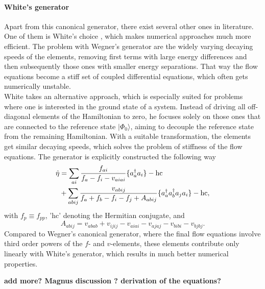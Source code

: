 \paragraph{White's generator}
Apart from this canonical generator, there exist several other ones in
literature. One of them is White's choice
\cite{White:2002fk}, which makes numerical approaches much
more efficient.  The problem with Wegner's generator are the widely
varying decaying speeds of the elements, removing first terms with
large energy differences and then subsequently those ones with smaller
energy separations.  That way the flow equations become a stiff set of
coupled differential equations, which often gets numerically
unstable.\\ White takes an alternative approach, which is especially
suited for problems where one is interested in the ground state of a
system. Instead of driving all off-diagonal elements of the
Hamiltonian to zero, he focuses solely on those ones that are
connected to the reference state $|\Phi_0\rangle$, aiming to decouple
the reference state from the remaining Hamiltonian. With a suitable
transformation, the elements get similar decaying speeds, which solves
the problem of stiffness of the flow equations.  The generator is
explicitly constructed the following way \cite{White:2002fk}
\begin{align}
\hat{\eta} &= \sum_{ai} \frac{f_{ai}}{f_a-f_i-v_{aiai}}\lbrace a_a^{\dagger}a_i\rbrace -\text{hc} \notag \\ & + \sum_{abij}
\frac{v_{abij}}{f_a+f_b-f_i-f_j+A_{abij}}\lbrace a_a^{\dagger}a_b^{\dagger}a_j
a_i\rbrace - \text{hc},
\label{eq:WhiteFull}
\end{align}
with $f_p \equiv f_{pp}$, 'hc' denoting the Hermitian conjugate, and
\[
A_{abij} = v_{abab} + v_{ijij} - v_{aiai} - v_{ajaj} - v_{bibi} -
v_{bjbj}.
\label{eq:White7}
\]
Compared to Wegner's canonical generator, where the final flow
equations involve third order powers of the $f$- and $v$-elements,
these elements contribute only linearly with White's generator, which
results in much better numerical properties.


{\bf add more? Magnus discussion ? derivation of the equations?}


